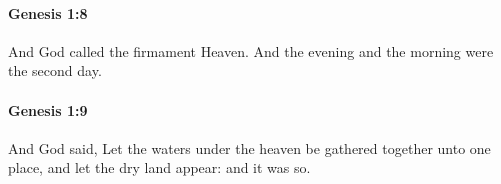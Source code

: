 		\paragraph{Genesis 1:8} %
			\label{GENESIS-1-8}

			And God called the firmament Heaven. And the evening and the morning were the second day.


		\paragraph{Genesis 1:9} %
			\label{GENESIS-1-9}

			And God said, Let the waters under the heaven be gathered together unto one place, and let the dry land appear: and it was so.


